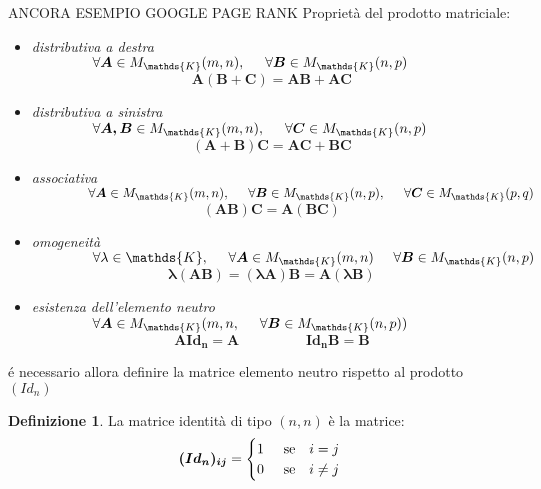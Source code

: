 \documentclass[a4paper, 12pt]{article}
\theoremstyle{definition}
\newtheorem{defn}[thm]{Definizione}
\begin{document}
\noindent ANCORA ESEMPIO GOOGLE PAGE RANK
\newpage
\noindent Proprietà del prodotto matriciale:
\begin{itemize}
    \item \textit{distributiva a destra} $\hspace{1.5 cm} \forall{\boldsymbol{A}} \in M_\mathds{K}(m,n), \hspace{0.5cm} \forall{\boldsymbol{B}} \in  M_\mathds{K}(n,p)$
    \[ \boldsymbol{A(B+C) = AB + AC} \]
    \item \textit{distributiva a sinistra} $\hspace{1.5 cm} \forall{\boldsymbol{A, B}} \in M_\mathds{K}(m,n), \hspace{0.5cm} \forall{\boldsymbol{C}} \in  M_\mathds{K}(n,p) \hspace{0.5cm} $
    \[ \boldsymbol{(A + B)C = AC + BC} \]
    \item \textit{associativa} $ \hspace{1.5 cm} \forall{\boldsymbol{A}} \in M_\mathds{K}(m,n), \hspace{0.5 cm} \forall{\boldsymbol{B}} \in M_\mathds{K}(n,p),\hspace{0.5 cm} \forall{\boldsymbol{C}} \in M_\mathds{K}(p,q)$
    \[ \boldsymbol{(AB)C = A(BC)} \]
    \item \textit{omogeneità} $\hspace{1.5 cm} \forall{\lambda} \in \mathds{K}, \hspace{0.5 cm} \forall{\boldsymbol{A}} \in M_\mathds{K}(m,n) \hspace{0.5 cm} \forall{\boldsymbol{B}} \in M_\mathds{K}(n,p) $
     \[ \boldsymbol{\lambda(AB) = (\lambda A)B = A(\lambda B)} \]
     \item \textit{esistenza dell'elemento neutro} $ \hspace{1.5cm}\forall{\boldsymbol{A}} \in M_\mathds{K}(m,n, \hspace{0.5 cm} \forall{\boldsymbol{B}} \in M_\mathds{K}(n,p))$
     \[ \boldsymbol{AId_n = A} \hspace{2cm} \boldsymbol{Id_nB = B } \]
\end{itemize}
\noindent é necessario allora definire la matrice elemento neutro rispetto al prodotto $(Id_n)$
\begin{defn}
    La matrice identità di tipo $(n,n)$ è la matrice:
    \begin{equation*}
    \boldsymbol{(Id_n)_{ij}} = \begin{cases}
     1 \hspace{0.5cm} \text{se} & i = j \\
     0 \hspace{0.5cm} \text{se} & i \neq j \\
    \end{cases}
    \end{equation*}
\end{defn}
\end{document}
